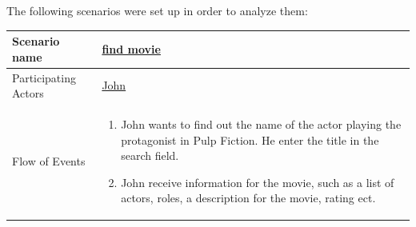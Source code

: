 The following scenarios were set up in order to analyze them:

\begin{center}
	\begin{tabular}{ | l | p{10cm} |  }
		 \hline
		Scenario name & \underline{find movie}  \\ \hline
		Participating Actors & \underline{John} \\ \hline
		Flow of Events & \begin{enumerate}
						\item John wants to find out the name of the actor playing the protagonist in Pulp Fiction. He enter the title in the search field.
						\item John receive information for the movie, such as a list of actors, roles, a description for the movie, rating ect.
						\end{enumerate}
						\\ \hline
						
	\end{tabular}
\end{center}



